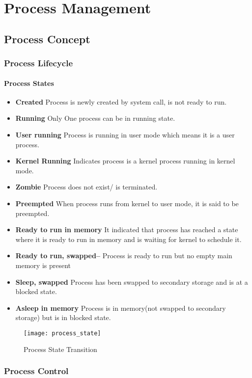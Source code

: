 \chapter{Process Management}
\section{Process Concept}
\subsection{Process Lifecycle}
\subsubsection{Process States}
\begin{itemize}
	\item \textbf{Created} Process is newly created by system call, is not ready to run.
	\item \textbf{Running} Only One process can be in running state.
	\item \textbf{User running} Process is running in user mode which means it is a user process.
	\item \textbf{Kernel Running} Indicates process is a kernel process running in kernel mode.
	\item \textbf{Zombie} Process does not exist/ is terminated.
	\item \textbf{Preempted} When process runs from kernel to user mode, it is said to be preempted.
	\item \textbf{Ready to run in memory} It indicated that process has reached a state where it is ready to run in memory and is waiting for kernel to schedule it.
	\item \textbf{Ready to run, swapped–} Process is ready to run but no empty main memory is present
	\item \textbf{Sleep, swapped} Process has been swapped to secondary storage and is at a blocked state.
	\item \textbf{Asleep in memory} Process is in memory(not swapped to secondary storage) but is in blocked state.
\end{itemize}
\begin{figure}[H]
	\centering
	\texttt{[image: process\_state]}
	\caption{Process State Transition}\label{fig_process_state_diagram}
\end{figure}
\subsection{Process Control}
